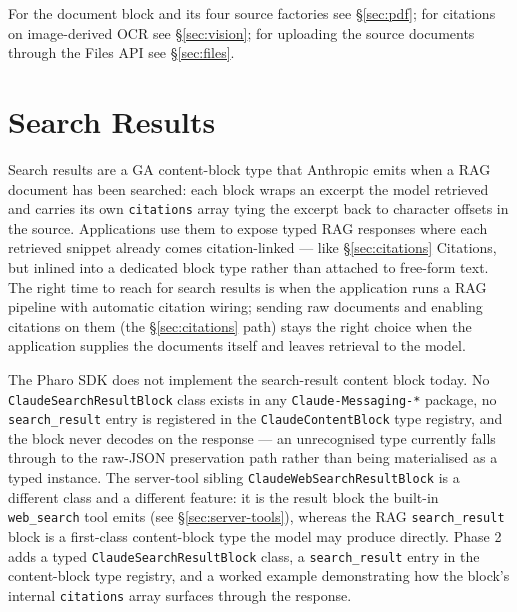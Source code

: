\documentclass[a4paper,10pt,fleqn]{article}
\begin{document}
For the document block and its four source factories see
\S\ref{sec:pdf}; for citations on image-derived OCR see
\S\ref{sec:vision}; for uploading the source documents through the
Files API see \S\ref{sec:files}.

\medskip
\begin{sloppypar}
\end{sloppypar}

\section{Search Results}
\label{sec:search-results}

Search results are a GA content-block type that Anthropic emits
when a RAG document has been searched: each block wraps an excerpt
the model retrieved and carries its own \texttt{citations} array
tying the excerpt back to character offsets in the source.
Applications use them to expose typed RAG responses where each
retrieved snippet already comes citation-linked --- like §\ref{sec:citations}
Citations, but inlined into a dedicated block type rather than
attached to free-form text.  The right time to reach for search
results is when the application runs a RAG pipeline with automatic
citation wiring; sending raw documents and enabling citations on
them (the §\ref{sec:citations} path) stays the right choice when
the application supplies the documents itself and leaves retrieval
to the model.

\begin{sloppypar}
The Pharo SDK does not implement the search-result content block
today.  No \texttt{ClaudeSearchResultBlock} class exists in any
\texttt{Claude-Messaging-*} package, no \texttt{search\_result}
entry is registered in the \texttt{ClaudeContentBlock} type
registry, and the block never decodes on the response --- an
unrecognised type currently falls through to the raw-JSON
preservation path rather than being materialised as a typed
instance.  The server-tool sibling \texttt{ClaudeWebSearchResultBlock}
is a different class and a different feature: it is the result
block the built-in \texttt{web\_search} tool emits (see
§\ref{sec:server-tools}), whereas the RAG \texttt{search\_result}
block is a first-class content-block type the model may produce
directly.  Phase 2 adds a typed \texttt{ClaudeSearchResultBlock}
class, a \texttt{search\_result} entry in the content-block type
registry, and a worked example demonstrating how the block's
internal \texttt{citations} array surfaces through the response.
\end{sloppypar}
\end{document}
